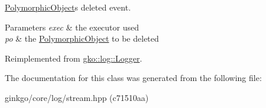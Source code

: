 \hyperlink{classgko_1_1PolymorphicObject}{Polymorphic\+Object}\textquotesingle{}s deleted event. 


\begin{DoxyParams}{Parameters}
{\em exec} & the executor used \\
\hline
{\em po} & the \hyperlink{classgko_1_1PolymorphicObject}{Polymorphic\+Object} to be deleted \\
\hline
\end{DoxyParams}


Reimplemented from \hyperlink{classgko_1_1log_1_1Logger}{gko\+::log\+::\+Logger}.



The documentation for this class was generated from the following file\+:\begin{DoxyCompactItemize}
\item 
ginkgo/core/log/stream.\+hpp (c71510aa)\end{DoxyCompactItemize}
